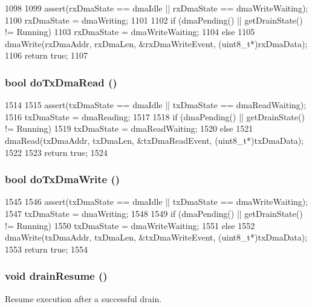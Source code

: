 \begin{DoxyCode}
1098 {
1099     assert(rxDmaState == dmaIdle || rxDmaState == dmaWriteWaiting);
1100     rxDmaState = dmaWriting;
1101 
1102     if (dmaPending() || getDrainState() != Running)
1103         rxDmaState = dmaWriteWaiting;
1104     else
1105         dmaWrite(rxDmaAddr, rxDmaLen, &rxDmaWriteEvent, (uint8_t*)rxDmaData);
1106     return true;
1107 }
\end{DoxyCode}
\hypertarget{classNSGigE_a3e71461dcffb91d5053640871a4a7373}{
\subsubsection[{doTxDmaRead}]{\setlength{\rightskip}{0pt plus 5cm}bool doTxDmaRead ()}}
\label{classNSGigE_a3e71461dcffb91d5053640871a4a7373}



\begin{DoxyCode}
1514 {
1515     assert(txDmaState == dmaIdle || txDmaState == dmaReadWaiting);
1516     txDmaState = dmaReading;
1517 
1518     if (dmaPending() || getDrainState() != Running)
1519         txDmaState = dmaReadWaiting;
1520     else
1521         dmaRead(txDmaAddr, txDmaLen, &txDmaReadEvent, (uint8_t*)txDmaData);
1522 
1523     return true;
1524 }
\end{DoxyCode}
\hypertarget{classNSGigE_aa826aa2281d09f6d6af76daee3c1795b}{
\subsubsection[{doTxDmaWrite}]{\setlength{\rightskip}{0pt plus 5cm}bool doTxDmaWrite ()}}
\label{classNSGigE_aa826aa2281d09f6d6af76daee3c1795b}



\begin{DoxyCode}
1545 {
1546     assert(txDmaState == dmaIdle || txDmaState == dmaWriteWaiting);
1547     txDmaState = dmaWriting;
1548 
1549     if (dmaPending() || getDrainState() != Running)
1550         txDmaState = dmaWriteWaiting;
1551     else
1552         dmaWrite(txDmaAddr, txDmaLen, &txDmaWriteEvent, (uint8_t*)txDmaData);
1553     return true;
1554 }
\end{DoxyCode}
\hypertarget{classNSGigE_a8f020d3237536fe007fc488c4125c5d8}{
\subsubsection[{drainResume}]{\setlength{\rightskip}{0pt plus 5cm}void drainResume ()}}
\label{classNSGigE_a8f020d3237536fe007fc488c4125c5d8}
Resume execution after a successful drain.

